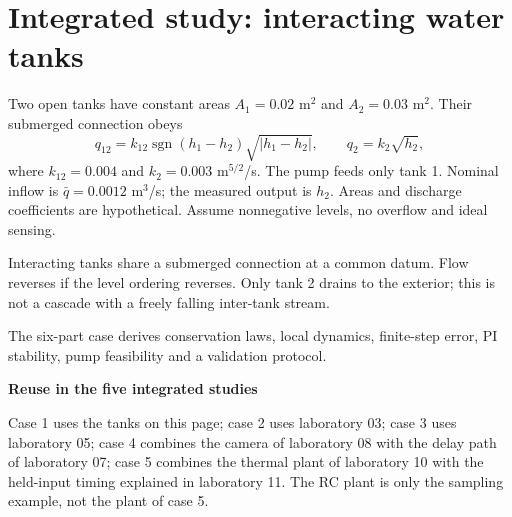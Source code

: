 \documentclass[10pt,a4paper]{article}
\begin{document}
\newpage
\section*{Integrated study: interacting water tanks}
Two open tanks have constant areas $A_1=0.02$ m$^2$ and $A_2=0.03$ m$^2$. Their submerged connection obeys
\[
q_{12}=k_{12}\operatorname{sgn}(h_1-h_2)\sqrt{|h_1-h_2|},\qquad
q_2=k_2\sqrt{h_2},
\]
where $k_{12}=0.004$ and $k_2=0.003$ m$^{5/2}$/s. The pump feeds only tank 1. Nominal inflow is $\bar q=0.0012$ m$^3$/s; the measured output is $h_2$. Areas and discharge coefficients are hypothetical. Assume nonnegative levels, no overflow and ideal sensing.
\begin{center}\resizebox{.88\linewidth}{!}{}\par{\small Interacting tanks share a submerged connection at a common datum. Flow reverses if the level ordering reverses. Only tank 2 drains to the exterior; this is not a cascade with a freely falling inter-tank stream.}\end{center}
The six-part case derives conservation laws, local dynamics, finite-step error, PI stability, pump feasibility and a validation protocol.
\par\medskip
\textbf{Reuse in the five integrated studies}\par
Case 1 uses the tanks on this page; case 2 uses laboratory 03; case 3 uses laboratory 05; case 4 combines the camera of laboratory 08 with the delay path of laboratory 07; case 5 combines the thermal plant of laboratory 10 with the held-input timing explained in laboratory 11. The RC plant is only the sampling example, not the plant of case 5.
\end{document}
